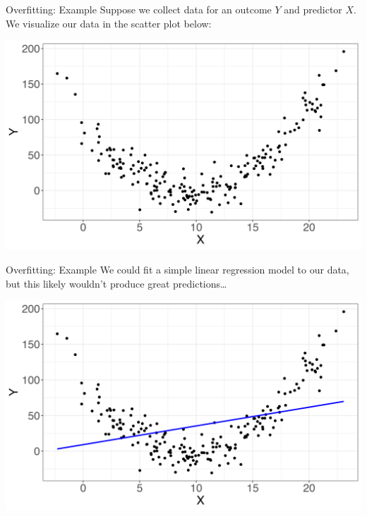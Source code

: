 \documentclass[10pt,t]{beamer}
\begin{document}
\begin{frame}{Overfitting: Example}
Suppose we collect data for an outcome $Y$ and predictor $X$. We visualize our data in the scatter plot below:

\vspace{0.3cm}

\centering \includegraphics[scale=0.4]{figures/overfit1.png}
\end{frame}

\begin{frame}{Overfitting: Example}
We could fit a simple linear regression model to our data, but this likely wouldn't produce great predictions\dots

\vspace{0.3cm}

\centering \includegraphics[scale=0.4]{figures/overfit2.png}
\end{frame}
\end{document}
